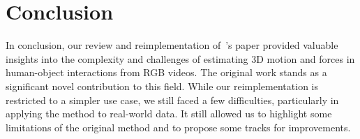 \section{Conclusion}
\label{sec:conclusion}

In conclusion, our review and reimplementation of~\citet{li2019estimating}'s paper provided valuable insights into the complexity 
and challenges of estimating 3D motion and forces in human-object interactions from RGB videos. 
The original work stands as a significant novel contribution to this field. While our reimplementation is restricted to a simpler use case,
we still faced a few difficulties, particularly in applying the method to real-world data.
It still allowed us to highlight some limitations of the original method and to propose some tracks for improvements.

